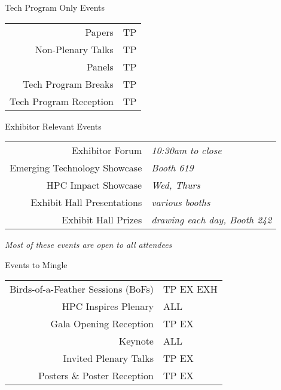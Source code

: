 \documentclass[presentation,xcolor=table]{beamer}
\begin{document}
\begin{frame}[label={sec:org2a4670b}]{Tech Program Only Events}
\begin{center}
\begin{tabular}{rl}
\alert{Papers} & \colorbox{sc18 red}{\color{white}TP}\\
\alert{Non-Plenary Talks} & \colorbox{sc18 red}{\color{white}TP}\\
\alert{Panels} & \colorbox{sc18 red}{\color{white}TP}\\
\alert{Tech Program Breaks} & \colorbox{sc18 red}{\color{white}TP}\\
\alert{Tech Program Reception} & \colorbox{sc18 red}{\color{white}TP}\\
\end{tabular}
\end{center}
\end{frame}

\begin{frame}[label={sec:org3a3a1f4}]{Exhibitor Relevant Events}
\begin{center}
\begin{tabular}{rl}
\alert{Exhibitor Forum} & \emph{10:30am to close}\\
\alert{Emerging Technology Showcase} & \emph{Booth 619}\\
\alert{HPC Impact Showcase} & \emph{Wed, Thurs}\\
\alert{Exhibit Hall Presentations} & \emph{various booths}\\
\alert{Exhibit Hall Prizes} & \emph{drawing each day, Booth 242}\\
\end{tabular}
\end{center}

\begin{center}
\emph{Most of these events are open to all attendees}
\end{center}
\end{frame}

\begin{frame}[label={sec:org53d7b58}]{Events to Mingle}
\begin{center}
\begin{tabular}{rl}
\alert{Birds-of-a-Feather Sessions (BoFs)} & \colorbox{sc18 red}{\color{white}TP EX EXH}\\
\alert{HPC Inspires Plenary} & \colorbox{sc18 red}{\color{white}ALL}\\
\alert{Gala Opening Reception} & \colorbox{sc18 red}{\color{white}TP EX}\\
\alert{Keynote} & \colorbox{sc18 red}{\color{white}ALL}\\
\alert{Invited Plenary Talks} & \colorbox{sc18 red}{\color{white}TP EX}\\
\alert{Posters} \& \alert{Poster Reception} & \colorbox{sc18 red}{\color{white}TP EX}\\
\end{tabular}
\end{center}
\end{frame}
\end{document}
